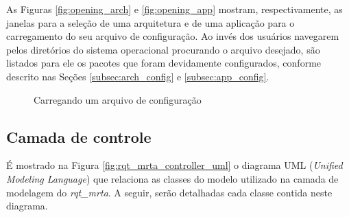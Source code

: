             As Figuras \ref{fig:opening_arch} e \ref{fig:opening_app} mostram, respectivamente, as janelas para a seleção de uma arquitetura e de uma aplicação para o carregamento do seu arquivo de configuração. Ao invés dos usuários navegarem pelos diretórios do sistema operacional procurando o arquivo desejado, são listados para ele os pacotes que foram devidamente configurados, conforme descrito nas Seções \ref{subsec:arch_config} e \ref{subsec:app_config}.
            
            \begin{figure}[htb]
                \centering
                \caption{Carregando um arquivo de configuração} \label{fig:opening_config}
            \end{figure}
            
        \subsection{Camada de controle} \label{subset:rqt_mrta_controller}
            
            É mostrado na Figura \ref{fig:rqt_mrta_controller_uml} o diagrama UML (\textit{Unified Modeling Language}) que relaciona as classes do modelo utilizado na camada de modelagem do \textit{rqt\_mrta}. A seguir, serão detalhadas cada classe contida neste diagrama.
            
